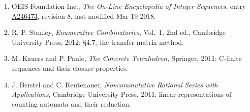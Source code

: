 \documentclass[11pt]{article}
\theoremstyle{definition}
\begin{document}
\begin{enumerate}

\item OEIS Foundation Inc., \emph{The On-Line Encyclopedia of Integer Sequences}, entry \href{https://oeis.org/A246473}{A246473}, revision 8, last modified Mar 19 2018.

\item R. P. Stanley, \emph{Enumerative Combinatorics}, Vol.~1, 2nd ed., Cambridge University Press, 2012; \S4.7, the transfer-matrix method.

\item M. Kauers and P. Paule, \emph{The Concrete Tetrahedron}, Springer, 2011; C-finite sequences and their closure properties.

\item J. Berstel and C. Reutenauer, \emph{Noncommutative Rational Series with Applications}, Cambridge University Press, 2011; linear representations of counting automata and their reduction.

\end{enumerate}
\end{document}
